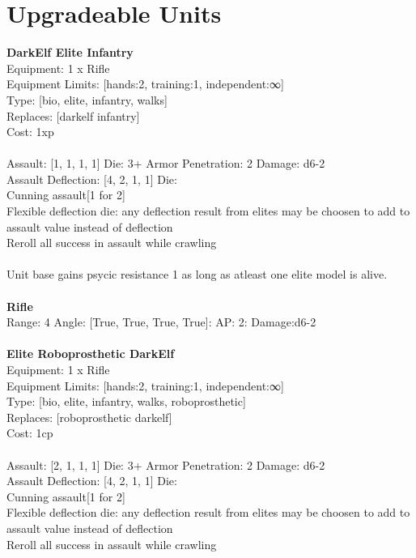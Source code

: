 \pagebreak\section{Upgradeable Units}{\bf DarkElf Elite Infantry } \\
Equipment: 1 x Rifle \\
Equipment Limits: [hands:2, training:1, independent:∞] \\
Type: [bio, elite, infantry, walks] \\
Replaces: [darkelf infantry] \\
Cost: 1xp\\
\ \\
Assault: [1, 1, 1, 1] Die: 3+ Armor Penetration: 2 Damage: d6-2 \\
Assault Deflection: [4, 2, 1, 1] Die: \\
\indent Cunning assault[1 for 2]\\ 
Flexible deflection die: any deflection result from elites may be choosen to add to assault value instead of deflection\\ 
Reroll all success in assault while crawling\\ 
 
\ \\
Unit base gains psycic resistance 1 as long as atleast one elite model is alive.\\ 

\ \\
{\bf Rifle } \\



Range: 4  Angle: [True, True, True, True]: AP: 2: Damage:d6-2 \\




 
\ \\

{\bf Elite Roboprosthetic DarkElf } \\
Equipment: 1 x Rifle \\
Equipment Limits: [hands:2, training:1, independent:∞] \\
Type: [bio, elite, infantry, walks, roboprosthetic] \\
Replaces: [roboprosthetic darkelf] \\
Cost: 1cp\\
\ \\
Assault: [2, 1, 1, 1] Die: 3+ Armor Penetration: 2 Damage: d6-2 \\
Assault Deflection: [4, 2, 1, 1] Die: \\
\indent Cunning assault[1 for 2]\\ 
Flexible deflection die: any deflection result from elites may be choosen to add to assault value instead of deflection\\ 
Reroll all success in assault while crawling\\ 
 

